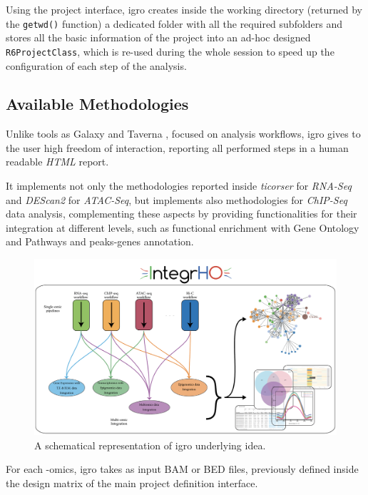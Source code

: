 Using the project interface, \gls{igro} creates inside the working directory (returned by the \lstinline!getwd()! function) a dedicated folder with all the required subfolders and stores all the basic information of the project into an ad-hoc designed \lstinline!R6ProjectClass!, which is re-used during the whole session to speed up the configuration of each step of the analysis.


\subsection{Available Methodologies}

Unlike tools as Galaxy \cite{Hillman-Jackson2012} and Taverna \cite{Wolstencroft2013}, focused on analysis workflows, \gls{igro} gives to the user high freedom of interaction, reporting all performed steps in a human readable \textit{HTML} report.
 
It implements not only the methodologies reported inside \textit{ticorser} for \textit{RNA-Seq} and \textit{DEScan2} for \textit{ATAC-Seq}, but implements also methodologies for \textit{ChIP-Seq} data analysis, complementing these aspects by providing functionalities for their integration at different levels, such as functional enrichment with Gene Ontology and Pathways and peaks-genes annotation.

\begin{figure}[H]
\centering
\includegraphics[width=\textwidth, keepaspectratio]{img/integrho/integrho_scheme.pdf}
\caption[integrho representation]{A schematical representation of \gls{igro} underlying idea.}
\label{fig:integrhoidea}
\end{figure}

For each -omics, \gls{igro} takes as input BAM or BED files, previously defined inside the design matrix of the main project definition interface.

